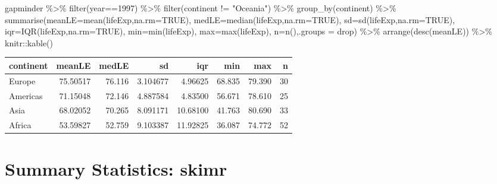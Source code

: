 \documentclass[
]{book}
\newenvironment{Shaded}{\begin{snugshade}}{\end{snugshade}}
\newcommand{\AttributeTok}[1]{\textcolor[rgb]{0.77,0.63,0.00}{#1}}
\newcommand{\ConstantTok}[1]{\textcolor[rgb]{0.00,0.00,0.00}{#1}}
\newcommand{\DecValTok}[1]{\textcolor[rgb]{0.00,0.00,0.81}{#1}}
\newcommand{\FunctionTok}[1]{\textcolor[rgb]{0.00,0.00,0.00}{#1}}
\newcommand{\NormalTok}[1]{#1}
\newcommand{\SpecialCharTok}[1]{\textcolor[rgb]{0.00,0.00,0.00}{#1}}
\newcommand{\StringTok}[1]{\textcolor[rgb]{0.31,0.60,0.02}{#1}}
\begin{document}
\begin{Shaded}
\begin{Highlighting}[]
\NormalTok{gapminder }\SpecialCharTok{\%\textgreater{}\%} \FunctionTok{filter}\NormalTok{(year}\SpecialCharTok{==}\DecValTok{1997}\NormalTok{) }\SpecialCharTok{\%\textgreater{}\%} 
  \FunctionTok{filter}\NormalTok{(continent }\SpecialCharTok{!=} \StringTok{"Oceania"}\NormalTok{) }\SpecialCharTok{\%\textgreater{}\%} 
  \FunctionTok{group\_by}\NormalTok{(continent) }\SpecialCharTok{\%\textgreater{}\%} 
  \FunctionTok{summarise}\NormalTok{(}\AttributeTok{meanLE=}\FunctionTok{mean}\NormalTok{(lifeExp,}\AttributeTok{na.rm=}\ConstantTok{TRUE}\NormalTok{),}
            \AttributeTok{medLE=}\FunctionTok{median}\NormalTok{(lifeExp,}\AttributeTok{na.rm=}\ConstantTok{TRUE}\NormalTok{),}
            \AttributeTok{sd=}\FunctionTok{sd}\NormalTok{(lifeExp,}\AttributeTok{na.rm=}\ConstantTok{TRUE}\NormalTok{),}
            \AttributeTok{iqr=}\FunctionTok{IQR}\NormalTok{(lifeExp,}\AttributeTok{na.rm=}\ConstantTok{TRUE}\NormalTok{),}
            \AttributeTok{min=}\FunctionTok{min}\NormalTok{(lifeExp),}
            \AttributeTok{max=}\FunctionTok{max}\NormalTok{(lifeExp),}
            \AttributeTok{n=}\FunctionTok{n}\NormalTok{(),}\AttributeTok{.groups =} \StringTok{\textquotesingle{}drop\textquotesingle{}}\NormalTok{)  }\SpecialCharTok{\%\textgreater{}\%} 
  \FunctionTok{arrange}\NormalTok{(}\FunctionTok{desc}\NormalTok{(meanLE)) }\SpecialCharTok{\%\textgreater{}\%}
\NormalTok{  knitr}\SpecialCharTok{::}\FunctionTok{kable}\NormalTok{()}
\end{Highlighting}
\end{Shaded}

\begin{tabular}{l|r|r|r|r|r|r|r}
\hline
continent & meanLE & medLE & sd & iqr & min & max & n\\
\hline
Europe & 75.50517 & 76.116 & 3.104677 & 4.96625 & 68.835 & 79.390 & 30\\
\hline
Americas & 71.15048 & 72.146 & 4.887584 & 4.83500 & 56.671 & 78.610 & 25\\
\hline
Asia & 68.02052 & 70.265 & 8.091171 & 10.68100 & 41.763 & 80.690 & 33\\
\hline
Africa & 53.59827 & 52.759 & 9.103387 & 11.92825 & 36.087 & 74.772 & 52\\
\hline
\end{tabular}

\hypertarget{summary-statistics-skimr}{%
\section{Summary Statistics: skimr}\label{summary-statistics-skimr}}
\end{document}
